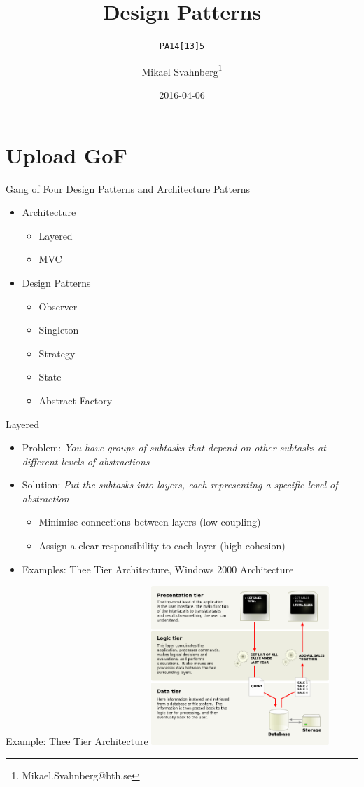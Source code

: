 \documentclass[10pt,t,a4paper]{beamer}
\author{Mikael Svahnberg\thanks{Mikael.Svahnberg@bth.se}}
\date{2016-04-06}
\title{Design Patterns}
\subtitle{\texttt{PA14[13]5}}
\begin{document}
\maketitle

\section{Upload GoF}
\label{sec:orgheadline19}
\begin{frame}[label={sec:orgheadline1}]{Gang of Four Design Patterns and Architecture Patterns}
\begin{itemize}
\item Architecture
\begin{itemize}
\item Layered
\item MVC
\end{itemize}
\item Design Patterns
\begin{itemize}
\item Observer
\item Singleton
\item Strategy
\item State
\item Abstract Factory
\end{itemize}
\end{itemize}
\end{frame}
\begin{frame}[label={sec:orgheadline2}]{Layered}
\begin{itemize}
\item Problem: \emph{You have groups of subtasks that depend on other subtasks at different levels of abstractions}
\item Solution: \emph{Put the subtasks into \alert{layers}, each representing a specific level of abstraction}
\begin{itemize}
\item Minimise connections between layers (low coupling)
\item Assign a clear responsibility to each layer (high cohesion)
\end{itemize}
\item Examples: Thee Tier Architecture, Windows 2000 Architecture
\end{itemize}
\end{frame}
\begin{frame}[label={sec:orgheadline3}]{Example: Thee Tier Architecture}
\includegraphics[height=6cm]{./IThreeTierArchitecture.png}
\end{frame}
\end{document}
